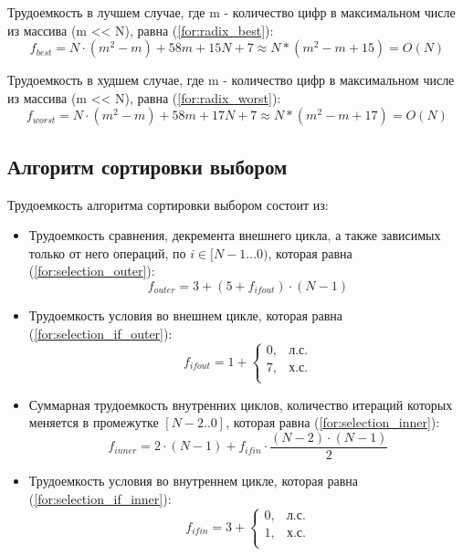 Трудоемкость в лучшем случае, где m - количество цифр в максимальном числе из массива (m << N), равна (\ref{for:radix_best}):
\begin{equation}
	\label{for:radix_best}
	f_{best} = N \cdot(m^2 - m) + 58m + 15N + 7\approx N*(m^2 - m + 15) = O(N)
\end{equation}

Трудоемкость в худшем случае, где m - количество цифр в максимальном числе из массива (m << N), равна (\ref{for:radix_worst}):
\begin{equation}
	\label{for:radix_worst}
	f_{worst} = N \cdot(m^2 - m) + 58m + 17N + 7\approx N*(m^2 - m + 17) = O(N)
\end{equation}

\subsection{Алгоритм сортировки выбором}

Трудоемкость алгоритма сортировки выбором состоит из:
\begin{itemize}
	\item Трудоемкость сравнения, декремента внешнего цикла, а также зависимых только от него операций, по $i \in [N-1...0)$, которая равна (\ref{for:selection_outer}):
	\begin{equation}
		\label{for:selection_outer}
		f_{outer} = 3 + (5 + f_{ifout}) \cdot (N - 1)
	\end{equation}
	\item Трудоемкость условия во внешнем цикле, которая равна (\ref{for:selection_if_outer}):
	\begin{equation}
		\label{for:selection_if_outer}
		f_{ifout} = 1 + \begin{cases}
			0, & \text{л.с.}\\
			7, & \text{х.с.}\\
		\end{cases}
	\end{equation}
	\item Суммарная трудоемкость внутренних циклов, количество итераций которых меняется в промежутке $[N-2..0]$, которая равна (\ref{for:selection_inner}):
	\begin{equation}
		\label{for:selection_inner}
		f_{inner} = 2 \cdot (N - 1) + f_{ifin} \cdot \frac{(N - 2) \cdot (N - 1)}{2}
	\end{equation}
	\item Трудоемкость условия во внутреннем цикле, которая равна (\ref{for:selection_if_inner}):
	\begin{equation}
		\label{for:selection_if_inner}
		f_{ifin} = 3 + \begin{cases}
			0, & \text{л.с.}\\
			1, & \text{х.с.}\\
		\end{cases}
	\end{equation}
\end{itemize}


